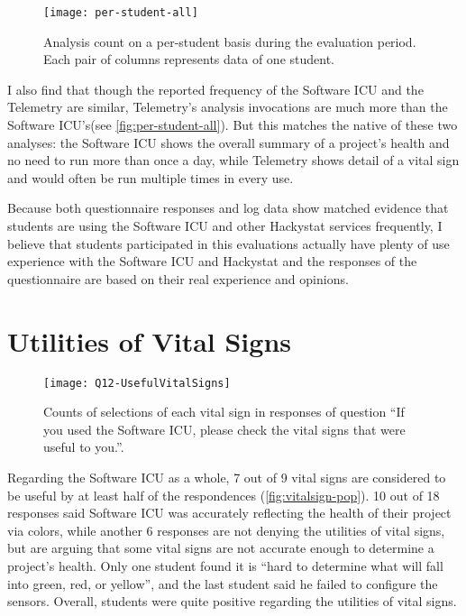 \begin{figure}[htbp] %
   \centering
   \texttt{[image: per-student-all]} 
   \caption[Analysis count on a per-student basis]{Analysis count on a per-student basis during the evaluation period. Each pair of columns represents data of one student.}
   \label{fig:per-student-all}
\end{figure}

I also find that though the reported frequency of the Software ICU and the Telemetry are similar, Telemetry's analysis invocations are much more than the Software ICU's(see \autoref{fig:per-student-all}). But this matches the native of these two analyses: the Software ICU shows the overall summary of a project's health and no need to run more than once a day, while Telemetry shows detail of a vital sign and would often be run multiple times in every use. 

Because both questionnaire responses and log data show matched evidence that students are using the Software ICU and other Hackystat services frequently, I believe that students participated in this evaluations actually have plenty of use experience with the Software ICU and Hackystat and the responses of the questionnaire are based on their real experience and opinions. 

\section{Utilities of Vital Signs}

\begin{figure}[htbp] %
   \centering
   \texttt{[image: Q12-UsefulVitalSigns]} 
   \caption[Vital sign popularity from survey]{Counts of selections of each vital sign in responses of question ``If you used the Software ICU, please check the vital signs that were useful to you.''.}
   \label{fig:vitalsign-pop}
\end{figure}

Regarding the Software ICU as a whole, 7 out of 9 vital signs are considered to be useful by at least half of the respondences (\autoref{fig:vitalsign-pop}). 10 out of 18 responses said Software ICU was accurately reflecting the health of their project via colors, while another 6 responses are not denying the utilities of vital signs, but are arguing that some vital signs are not accurate enough to determine a project's health. Only one student found it is ``hard to determine what will fall into green, red, or yellow'', and the last student said he failed to configure the sensors. Overall, students were quite positive regarding the utilities of vital signs.

